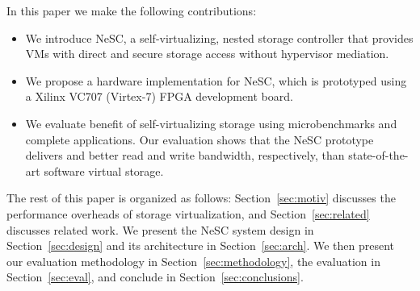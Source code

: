 In this paper we make the following contributions:
\begin{itemize}
\item
  We introduce NeSC, a self-virtualizing, nested storage controller that provides VMs with direct and secure storage access without hypervisor mediation.

\item
  We propose a hardware implementation for NeSC, which is prototyped using a Xilinx VC707 (Virtex-7) FPGA development board.

\item
  We evaluate benefit of self-virtualizing storage using microbenchmarks and complete applications. Our evaluation shows that the NeSC prototype delivers  and  better read and write bandwidth, respectively, than state-of-the-art software virtual storage.
  
\end{itemize}


The rest of this paper is organized as follows:
Section~\ref{sec:motiv} discusses the performance overheads of storage virtualization, and  Section~\ref{sec:related} discusses related work.
We present the NeSC system design in Section~\ref{sec:design} and its architecture in Section~\ref{sec:arch}. We then present our evaluation methodology in Section~\ref{sec:methodology}, the evaluation in Section~\ref{sec:eval}, and conclude in Section~\ref{sec:conclusions}.



